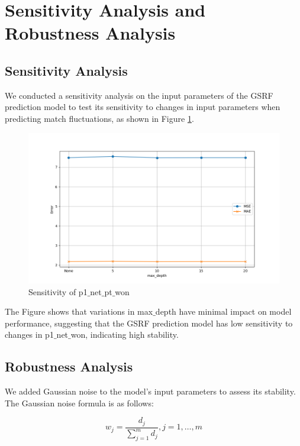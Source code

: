 \documentclass[12pt]{article}%
\begin{document}
\section{Sensitivity Analysis and Robustness Analysis}

\subsection{Sensitivity Analysis}
We conducted a sensitivity analysis on the input parameters of the GSRF prediction model to test its sensitivity to changes in input parameters when predicting match fluctuations, as shown in Figure \ref{mg1}.

\begin{figure}[H]
	\centering
	\includegraphics[scale=0.63]{figure//mg1.png}
	\caption{Sensitivity of p1$\_$net$\_$pt$\_$won}
	\label{mg1}
\end{figure}

The Figure shows that variations in max$\_$depth have minimal impact on model performance, suggesting that the GSRF prediction model has low sensitivity to changes in p1$\_$net$\_$won, indicating high stability.

\subsection{Robustness Analysis}
We added Gaussian noise to the model's input parameters to assess its stability. The Gaussian noise formula is as follows: 

\begin{equation}
	w_j=\frac{d_j}{\sum_{j=1}^m d_j}, j=1, \ldots, m
\end{equation}
\end{document}
